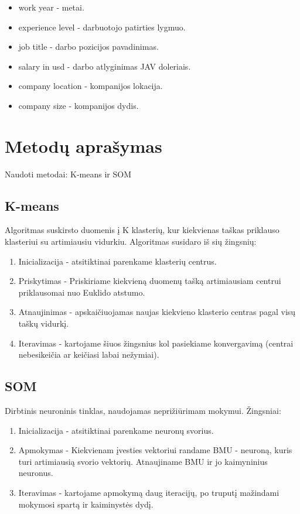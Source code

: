 \documentclass[14pt]{extarticle}
\begin{document}
\begin{itemize}
  \item work year - metai.
  \item experience level - darbuotojo patirties lygmuo.
  \item job title - darbo pozicijos pavadinimas.
  \item salary in usd - darbo atlyginimas JAV doleriais.
  \item company location - kompanijos lokacija.
  \item company size - kompanijos dydis.
\end{itemize}

\clearpage

\section{Metodų aprašymas}

Naudoti metodai: K-means ir SOM

\subsection{K-means}

Algoritmas suskirsto duomenis į K klasterių, kur kiekvienas taškas priklauso
klasteriui su artimiausiu vidurkiu. Algoritmas susidaro iš sių žingsnių:

\begin{enumerate}
  \item Inicializacija - atsitiktinai parenkame klasterių centrus.
  \item Priskytimas - Priskiriame kiekvieną duomenų tašką artimiausiam centrui priklausomai
    nuo Euklido atstumo.
  \item Atnaujinimas - apskaičiuojamas naujas kiekvieno klasterio centras
    pagal visų taškų vidurkį.
  \item Iteravimas - kartojame šiuos žingsnius kol pasiekiame konvergavimą 
    (centrai nebesikeičia ar keičiasi labai nežymiai).
\end{enumerate}

\subsection{SOM}

Dirbtinis neuroninis tinklas, naudojamas neprižiūrimam mokymui. Žingsniai:

\begin{enumerate}
  \item Inicializacija - atsitiktinai parenkame neuronų svorius.
  \item Apmokymas - Kiekvienam įvesties vektoriui randame BMU - neuroną, kuris
    turi artimiausią svorio vektorių. Atnaujiname BMU ir jo kaimyninius neuronus.
  \item Iteravimas - kartojame apmokymą daug iteracijų, po truputį mažindami
    mokymosi spartą ir kaiminystės dydį.
\end{enumerate}
\end{document}
